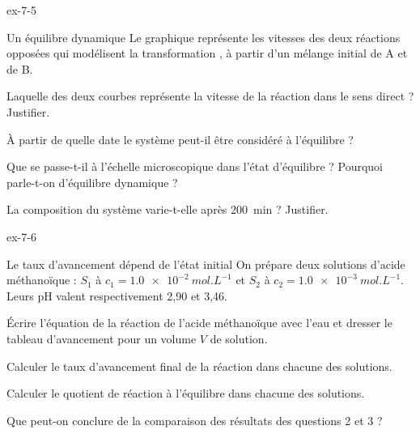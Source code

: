 \begin{blocLivre}{ex-7-5}
\begin{exercice}[1]{Un équilibre dynamique}
Le graphique représente les vitesses des deux réactions opposées qui modélisent la transformation
, à partir d'un mélange initial de A et de B.
\begin{questions}
\item Laquelle des deux courbes représente la vitesse de la réaction dans le sens direct ? Justifier.
\item À partir de quelle date le système peut-il être considéré à l'équilibre ?
\item Que se passe-t-il à l'échelle microscopique dans l'état d'équilibre ? Pourquoi parle-t-on d'équilibre dynamique ?
\item La composition du système varie-t-elle après 200~min ? Justifier.
\end{questions}
\end{exercice}
\end{blocLivre}
\begin{blocLivre}{ex-7-6}
\begin{exercice}[2]{Le taux d'avancement dépend de l'état initial}
On prépare deux solutions d'acide méthanoïque  : $S_1$ à $c_1=\qty{1,0e-2}{mol.L^{-1}}$ et $S_2$ à
$c_2=\qty{1,0e-3}{mol.L^{-1}}$. Leurs pH valent respectivement 2,90 et 3,46.
\begin{questions}
\item Écrire l'équation de la réaction de l'acide méthanoïque avec l'eau et dresser le tableau d'avancement pour un
volume $V$ de solution.
\item Calculer le taux d'avancement final de la réaction dans chacune des solutions.
\item Calculer le quotient de réaction à l'équilibre dans chacune des solutions.
\item Que peut-on conclure de la comparaison des résultats des questions 2 et 3 ?
\end{questions}
\end{exercice}
\end{blocLivre}
